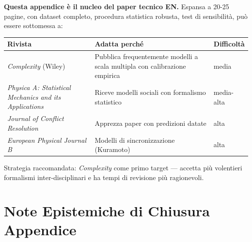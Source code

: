 \Hypoth{} \textbf{Questa appendice è il nucleo del paper tecnico EN.}
Espansa a 20-25 pagine, con dataset completo, procedura statistica
robusta, test di sensibilità, può essere sottomessa a:

{\def\LTcaptype{none} %
{\small\begin{longtable}[]{@{}
  >{\raggedright\arraybackslash}p{}
  >{\raggedright\arraybackslash}p{}
  >{\raggedright\arraybackslash}p{}@{}}
\toprule\noalign{}
\begin{minipage}[b]{\linewidth}\raggedright
Rivista
\end{minipage} & \begin{minipage}[b]{\linewidth}\raggedright
Adatta perché
\end{minipage} & \begin{minipage}[b]{\linewidth}\raggedright
Difficoltà
\end{minipage} \\
\midrule\noalign{}
\endhead
\bottomrule\noalign{}
\endlastfoot
\emph{Complexity} (Wiley) & Pubblica frequentemente modelli a scala
multipla con calibrazione empirica & media \\
\emph{Physica A: Statistical Mechanics and its Applications} & Riceve
modelli sociali con formalismo statistico & media-alta \\
\emph{Journal of Conflict Resolution} & Apprezza paper con predizioni
datate & alta \\
\emph{European Physical Journal B} & Modelli di sincronizzazione
(Kuramoto) & alta \\
\end{longtable}}
}

Strategia raccomandata: \emph{Complexity} come primo target --- accetta
più volentieri formalismi inter-disciplinari e ha tempi di revisione più
ragionevoli.



\section{Note Epistemiche di Chiusura
Appendice}\label{note-epistemiche-di-chiusura-appendice}


